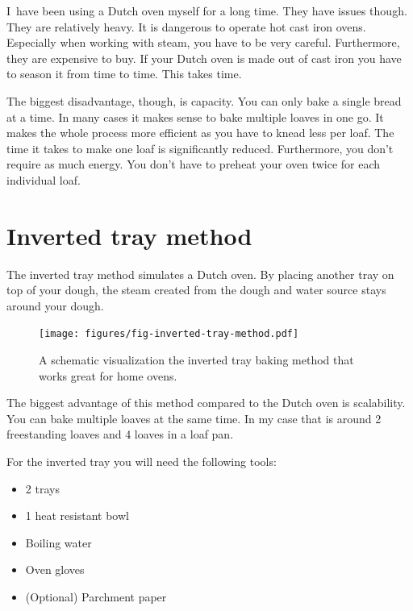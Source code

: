 I~have been using a Dutch oven myself for a long time. They
have issues though. They are relatively heavy. It is dangerous
to operate hot cast iron ovens. Especially when working with steam,
you have to be very careful. Furthermore,
they are expensive to buy. If your Dutch oven is made out
of cast iron you have to season it from time to time. This takes
time.

The biggest disadvantage, though, is
capacity. You can only bake a single bread at a time.
In many cases it makes sense to bake multiple
loaves in one go. It makes the whole process more
efficient as you have to knead less per loaf. The time it
takes to make one loaf is significantly reduced. Furthermore,
you don't require as much energy. You don't have
to preheat your oven twice for each individual loaf.


\section{Inverted tray method}

The inverted tray method simulates a Dutch oven.
By placing another tray on top of your dough, the steam
created from the dough and water source stays
around your dough.

\begin{figure}[!htb]
  \texttt{[image: figures/fig-inverted-tray-method.pdf]}
  \caption{A schematic visualization the inverted tray baking method that works great for home ovens.}
  \label{fig:inverted-tray-process}
\end{figure}


The biggest advantage of this method compared to the
Dutch oven is scalability. You can bake multiple loaves
at the same time. In my case that is around 2 freestanding
loaves and 4 loaves in a loaf pan.

For the inverted tray you will need the following tools:
\begin{itemize}
\item 2 trays
\item 1 heat resistant bowl
\item Boiling water
\item Oven gloves
\item (Optional) Parchment paper
\end{itemize}

